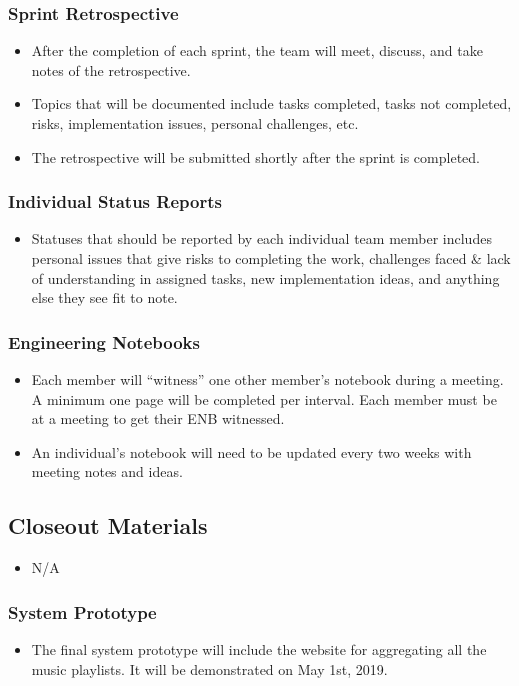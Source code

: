 \subsubsection{Sprint Retrospective}
\begin{itemize}
  \item After the completion of each sprint, the team will meet, discuss, and take notes of the retrospective.
  \item Topics that will be documented include tasks completed, tasks not completed, risks, implementation issues, personal challenges, etc.
  \item The retrospective will be submitted shortly after the sprint is completed.
\end{itemize}

\subsubsection{Individual Status Reports}
\begin{itemize}
  \item Statuses that should be reported by each individual team member includes personal issues that give risks to completing the work, challenges faced \& lack of understanding in assigned tasks, new implementation ideas, and anything else they see fit to note.
\end{itemize}

\subsubsection{Engineering Notebooks}
\begin{itemize}
  \item Each member will “witness” one other member’s notebook during a meeting. A minimum one page will be completed per interval. Each member must be at a meeting to get their ENB witnessed.
  \item An individual’s notebook will need to be updated every two weeks with meeting notes and ideas.
\end{itemize}

\subsection{Closeout Materials}
\begin{itemize}
  \item N/A
\end{itemize}

\subsubsection{System Prototype}
\begin{itemize}
  \item The final system prototype will include the website for aggregating all the music playlists. It will be demonstrated on May 1st, 2019.
\end{itemize}

